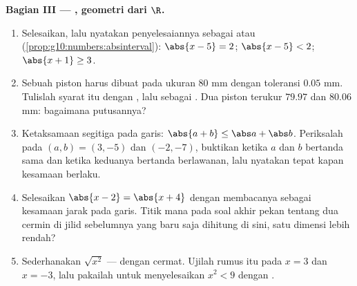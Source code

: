 \begin{problem}
\medskip
\noindent\textbf{Bagian III --- , geometri dari
$\R$.}
\begin{enumerate}[resume]
  \item Selesaikan, lalu nyatakan penyelesaiannya sebagai  atau
         (\cref{prop:g10:numbers:absinterval}):
        $\abs{x - 5} = 2$; \quad $\abs{x - 5} < 2$; \quad
        $\abs{x + 1} \geq 3$.
  \item Sebuah piston harus dibuat pada ukuran $80$ mm dengan
        toleransi $0.05$ mm. Tulislah syarat itu dengan
        , lalu sebagai . Dua piston terukur
        $79.97$ dan $80.06$ mm: bagaimana putusannya?
  \item Ketaksamaan segitiga pada garis:
        $\abs{a + b} \leq \abs a + \abs b$. Periksalah pada
        $(a, b) = (3, -5)$ dan $(-2, -7)$, buktikan ketika $a$ dan
        $b$ bertanda sama dan ketika keduanya bertanda berlawanan,
        lalu nyatakan tepat kapan kesamaan berlaku.
  \item Selesaikan $\abs{x - 2} = \abs{x + 4}$ dengan membacanya sebagai
        kesamaan jarak pada garis. Titik mana pada soal akhir pekan tentang
        dua cermin di jilid sebelumnya yang baru saja dihitung di sini, satu
        dimensi lebih rendah?
  \item Sederhanakan $\sqrt{x^2}$ --- dengan cermat. Ujilah rumus itu
        pada $x = 3$ dan $x = -3$, lalu pakailah untuk menyelesaikan
        $x^2 < 9$ dengan .
\end{enumerate}


\end{problem}
